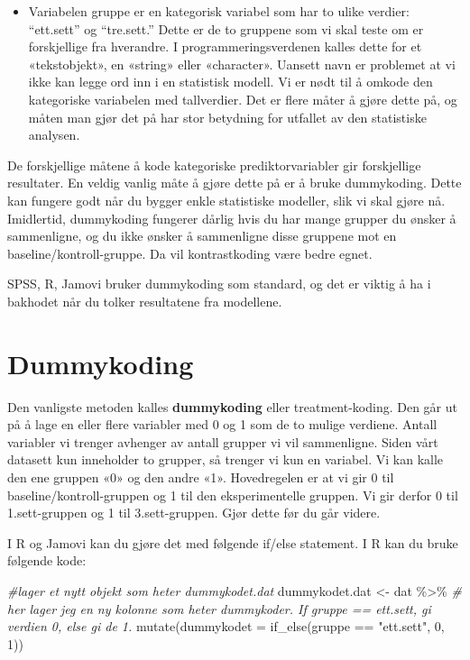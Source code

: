 \documentclass[
]{book}
\newenvironment{Shaded}{\begin{snugshade}}{\end{snugshade}}
\newcommand{\AttributeTok}[1]{\textcolor[rgb]{0.77,0.63,0.00}{#1}}
\newcommand{\CommentTok}[1]{\textcolor[rgb]{0.56,0.35,0.01}{\textit{#1}}}
\newcommand{\DecValTok}[1]{\textcolor[rgb]{0.00,0.00,0.81}{#1}}
\newcommand{\FunctionTok}[1]{\textcolor[rgb]{0.00,0.00,0.00}{#1}}
\newcommand{\NormalTok}[1]{#1}
\newcommand{\OtherTok}[1]{\textcolor[rgb]{0.56,0.35,0.01}{#1}}
\newcommand{\SpecialCharTok}[1]{\textcolor[rgb]{0.00,0.00,0.00}{#1}}
\newcommand{\StringTok}[1]{\textcolor[rgb]{0.31,0.60,0.02}{#1}}
\providecommand{\tightlist}{%
  \setlength{\itemsep}{0pt}\setlength{\parskip}{0pt}}
\begin{document}
\begin{itemize}
\tightlist
\item
  Variabelen gruppe er en kategorisk variabel som har to ulike verdier: ``ett.sett'' og ``tre.sett.'' Dette er de to gruppene som vi skal teste om er forskjellige fra hverandre. I programmeringsverdenen kalles dette for et «tekstobjekt», en «string» eller «character». Uansett navn er problemet at vi ikke kan legge ord inn i en statistisk modell. Vi er nødt til å omkode den kategoriske variabelen med tallverdier. Det er flere måter å gjøre dette på, og måten man gjør det på har stor betydning for utfallet av den statistiske analysen.
\end{itemize}

De forskjellige måtene å kode kategoriske prediktorvariabler gir forskjellige resultater. En veldig vanlig måte å gjøre dette på er å bruke dummykoding. Dette kan fungere godt når du bygger enkle statistiske modeller, slik vi skal gjøre nå. Imidlertid, dummykoding fungerer dårlig hvis du har mange grupper du ønsker å sammenligne, og du ikke ønsker å sammenligne disse gruppene mot en baseline/kontroll-gruppe. Da vil kontrastkoding være bedre egnet.

SPSS, R, Jamovi bruker dummykoding som standard, og det er viktig å ha i bakhodet når du tolker resultatene fra modellene.

\hypertarget{dummykoding}{%
\section{Dummykoding}\label{dummykoding}}

Den vanligste metoden kalles \textbf{dummykoding} eller treatment-koding. Den går ut på å lage en eller flere variabler med 0 og 1 som de to mulige verdiene. Antall variabler vi trenger avhenger av antall grupper vi vil sammenligne. Siden vårt datasett kun inneholder to grupper, så trenger vi kun en variabel. Vi kan kalle den ene gruppen «0» og den andre «1». Hovedregelen er at vi gir 0 til baseline/kontroll-gruppen og 1 til den eksperimentelle gruppen. Vi gir derfor 0 til 1.sett-gruppen og 1 til 3.sett-gruppen. Gjør dette før du går videre.

I R og Jamovi kan du gjøre det med følgende if/else statement. I R kan du bruke følgende kode:

\begin{Shaded}
\begin{Highlighting}[]
\CommentTok{\#lager et nytt objekt som heter dummykodet.dat}
\NormalTok{dummykodet.dat }\OtherTok{\textless{}{-}}\NormalTok{ dat }\SpecialCharTok{\%\textgreater{}\%}
  \CommentTok{\# her lager jeg en ny kolonne som heter dummykoder. If gruppe == \textquotesingle{}ett.sett\textquotesingle{}, gi verdien 0, else gi de 1.}
  \FunctionTok{mutate}\NormalTok{(}\AttributeTok{dummykodet =} \FunctionTok{if\_else}\NormalTok{(gruppe }\SpecialCharTok{==} \StringTok{"ett.sett"}\NormalTok{, }\DecValTok{0}\NormalTok{, }\DecValTok{1}\NormalTok{))}
\end{Highlighting}
\end{Shaded}
\end{document}

